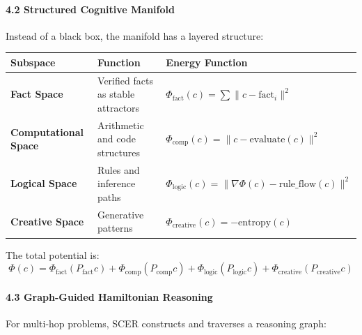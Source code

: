 \documentclass[
  11pt,
  a4paper,
]{article}
\begin{document}
\paragraph{4.2 Structured Cognitive
Manifold}\label{structured-cognitive-manifold}

Instead of a black box, the manifold has a layered structure:

\begin{longtable}[]{@{}
  >{\raggedright\arraybackslash}p{}
  >{\raggedright\arraybackslash}p{}
  >{\raggedright\arraybackslash}p{}@{}}
\toprule\noalign{}
\begin{minipage}[b]{\linewidth}\raggedright
Subspace
\end{minipage} & \begin{minipage}[b]{\linewidth}\raggedright
Function
\end{minipage} & \begin{minipage}[b]{\linewidth}\raggedright
Energy Function
\end{minipage} \\
\midrule\noalign{}
\endhead
\bottomrule\noalign{}
\endlastfoot
\textbf{Fact Space} & Verified facts as stable attractors &
\(\Phi_{\text{fact}}(c) = \sum \|c - \text{fact}_i\|^2\) \\
\textbf{Computational Space} & Arithmetic and code structures &
\(\Phi_{\text{comp}}(c) = \|c - \text{evaluate}(c)\|^2\) \\
\textbf{Logical Space} & Rules and inference paths &
\(\Phi_{\text{logic}}(c) = \|\nabla\Phi(c) - \text{rule\_flow}(c)\|^2\) \\
\textbf{Creative Space} & Generative patterns &
\(\Phi_{\text{creative}}(c) = -\text{entropy}(c)\) \\
\end{longtable}

The total potential is: \[
\Phi(c) = \Phi_{\text{fact}}(P_{\text{fact}}c) + \Phi_{\text{comp}}(P_{\text{comp}}c) + \Phi_{\text{logic}}(P_{\text{logic}}c) + \Phi_{\text{creative}}(P_{\text{creative}}c)
\]

\paragraph{4.3 Graph-Guided Hamiltonian
Reasoning}\label{graph-guided-hamiltonian-reasoning}

For multi-hop problems, SCER constructs and traverses a reasoning graph:
\end{document}
